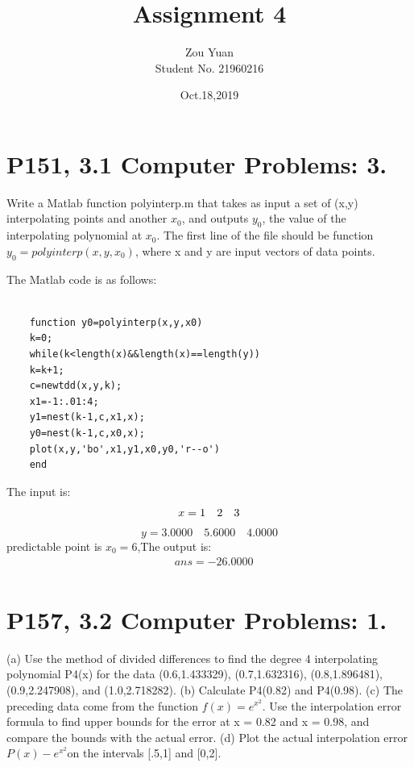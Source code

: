 \documentclass[UTF8]{ctexart}
\title{Assignment 4}  %
\author{Zou Yuan\\Student No. 21960216}   %
\date{Oct.18,2019}       %
\begin{document}
	\maketitle
	\section{P151, 3.1 Computer Problems: 3.}
	Write a Matlab function polyinterp.m that takes as input a set of (x,y) interpolating
	points and another $x_0$, and outputs $y_0$, the value of the interpolating polynomial at $x_0$. The first
	line of the file should be function $y_0 = polyinterp(x,y,x_0)$, where x and y are
	input vectors of data points. 

	The Matlab code is as follows:
	
	\begin{centering}
	\begin{lstlisting}
	
	function y0=polyinterp(x,y,x0)
	k=0;                       
	while(k<length(x)&&length(x)==length(y))                      
	k=k+1;                         
	c=newtdd(x,y,k);
	x1=-1:.01:4;
	y1=nest(k-1,c,x1,x);  
	y0=nest(k-1,c,x0,x);
	plot(x,y,'bo',x1,y1,x0,y0,'r--o')	
	end
	\end{lstlisting}
		\end{centering}
The input is:$$x =
1 \quad2\quad3\\$$$$y =
3.0000   \quad 5.6000 \quad   4.0000$$	
predictable point is $x_0=6$,The output is:
\begin{align*}
&ans =
-26.0000\\
\end{align*}

\section{P157, 3.2 Computer Problems: 1.}
   (a) Use the method of divided differences to find the degree 4 interpolating polynomial P4(x)
   for the data (0.6,1.433329), (0.7,1.632316), (0.8,1.896481), (0.9,2.247908), and
   (1.0,2.718282). (b) Calculate P4(0.82) and P4(0.98). (c) The preceding data come from the function $f (x) = e^{x^2}$. Use the interpolation error formula to find upper bounds for the error at
   x = 0.82 and x = 0.98, and compare the bounds with the actual error. (d) Plot the actual
   interpolation error $P(x) − e^{x^2} $on the intervals [.5,1] and [0,2].
   
\end{document}
